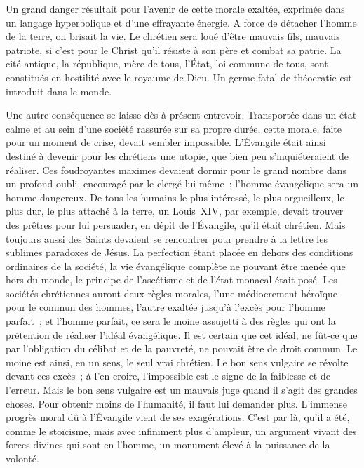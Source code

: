 \documentclass[french,twoside]{book} %
\begin{document}
Un grand danger résultait pour l’avenir de cette morale exaltée, exprimée dans un langage hyperbolique et d’une effrayante énergie. A force de détacher l’homme de la terre, on brisait la vie. Le chrétien sera loué d’être mauvais fils, mauvais patriote, si c’est pour le Christ qu’il résiste à son père et combat sa patrie. La cité antique, la république, mère de tous, l’État, loi commune de tous, sont constitués en hostilité avec le royaume de Dieu. Un germe fatal de théocratie est introduit dans le monde.\par
Une autre conséquence se laisse dès à présent entrevoir. Transportée dans un état calme et au sein d’une société rassurée sur sa propre durée, cette morale, faite pour un moment de crise, devait sembler impossible. L’Évangile était ainsi destiné à devenir pour les chrétiens une utopie, que bien peu s’inquiéteraient de réaliser. Ces foudroyantes maximes devaient dormir pour le grand nombre dans un profond oubli, encouragé par le clergé lui-même ; l’homme évangélique sera un homme dangereux. De tous les humains le plus intéressé, le plus orgueilleux, le plus dur, le plus attaché à la terre, un Louis XIV, par exemple, devait trouver des prêtres pour lui persuader, en dépit de l’Évangile, qu’il était chrétien. Mais toujours aussi des Saints devaient se rencontrer pour prendre à la lettre les sublimes paradoxes de Jésus. La perfection étant placée en dehors des conditions ordinaires de la société, la vie évangélique complète ne pouvant être menée que hors du monde, le principe de l’ascétisme et de l’état monacal était posé. Les sociétés chrétiennes auront deux règles morales, l’une médiocrement héroïque pour le commun des hommes, l’autre exaltée jusqu’à l’excès pour l’homme parfait ; et l’homme parfait, ce sera le moine assujetti à des règles qui ont la prétention de réaliser l’idéal évangélique. Il est certain que cet idéal, ne fût-ce que par l’obligation du célibat et de la pauvreté, ne pouvait être de droit commun. Le moine est ainsi, en un sens, le seul vrai chrétien. Le bon sens vulgaire se révolte devant ces excès ; à l’en croire, l’impossible est le signe de la faiblesse et de l’erreur. Mais le bon sens vulgaire est un mauvais juge quand il s’agit des grandes choses. Pour obtenir moins de l’humanité, il faut lui demander plus. L’immense progrès moral dû à l’Évangile vient de ses exagérations. C’est par là, qu’il a été, comme le stoïcisme, mais avec infiniment plus d’ampleur, un argument vivant des forces divines qui sont en l’homme, un monument élevé à la puissance de la volonté.\par
\end{document}
